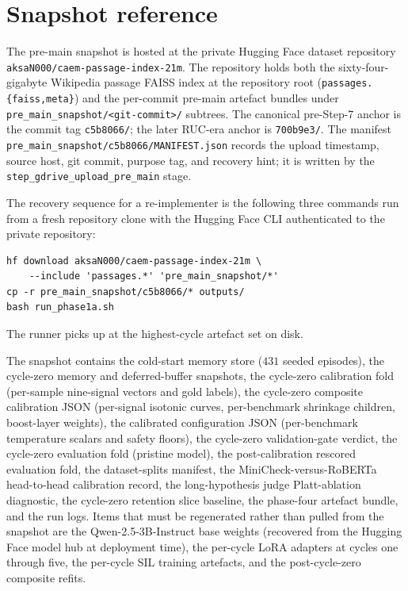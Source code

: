 \section{Snapshot reference}
\label{app:snapshot}

The pre-main snapshot is hosted at the private Hugging Face dataset repository \verb|aksaN000/caem-passage-index-21m|. The repository holds both the sixty-four-gigabyte Wikipedia passage FAISS index at the repository root (\verb|passages.{faiss,meta}|) and the per-commit pre-main artefact bundles under \verb|pre_main_snapshot/<git-commit>/| subtrees. The canonical pre-Step-7 anchor is the commit tag \verb|c5b8066/|; the later RUC-era anchor is \verb|700b9e3/|. The manifest \verb|pre_main_snapshot/c5b8066/MANIFEST.json| records the upload timestamp, source host, git commit, purpose tag, and recovery hint; it is written by the \verb|step_gdrive_upload_pre_main| stage.

The recovery sequence for a re-implementer is the following three commands run from a fresh repository clone with the Hugging Face CLI authenticated to the private repository:
\begin{verbatim}
hf download aksaN000/caem-passage-index-21m \
    --include 'passages.*' 'pre_main_snapshot/*'
cp -r pre_main_snapshot/c5b8066/* outputs/
bash run_phase1a.sh
\end{verbatim}
The runner picks up at the highest-cycle artefact set on disk.

The snapshot contains the cold-start memory store ($431$ seeded episodes), the cycle-zero memory and deferred-buffer snapshots, the cycle-zero calibration fold (per-sample nine-signal vectors and gold labels), the cycle-zero composite calibration JSON (per-signal isotonic curves, per-benchmark shrinkage children, boost-layer weights), the calibrated configuration JSON (per-benchmark temperature scalars and safety floors), the cycle-zero validation-gate verdict, the cycle-zero evaluation fold (pristine model), the post-calibration rescored evaluation fold, the dataset-splits manifest, the MiniCheck-versus-RoBERTa head-to-head calibration record, the long-hypothesis judge Platt-ablation diagnostic, the cycle-zero retention slice baseline, the phase-four artefact bundle, and the run logs. Items that must be regenerated rather than pulled from the snapshot are the Qwen-2.5-3B-Instruct base weights (recovered from the Hugging Face model hub at deployment time), the per-cycle LoRA adapters at cycles one through five, the per-cycle SIL training artefacts, and the post-cycle-zero composite refits.

